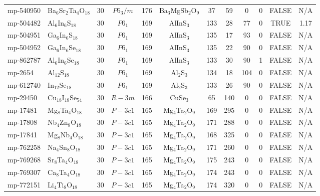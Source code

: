 {\begin{longtable}{llcccccccccc}
    mp-540950 & Ba$_{6}$Sr$_{2}$Ta$_{4}$O$_{18}$ & 30    & $P6_3/m$ & 176   & Ba$_{3}$MgSb$_{2}$O$_{9}$ & 37    & 59    & 0     & 0     & FALSE & N/A \\
    mp-504482 & Al$_{6}$In$_{6}$S$_{18}$ & 30    & $P6_1$ & 169   & AlInS$_{3}$ & 133   & 28    & 77    & 0     & TRUE  & 1.17  \\
    mp-504951 & Ga$_{6}$In$_{6}$S$_{18}$ & 30    & $P6_1$ & 169   & AlInS$_{3}$ & 135   & 17    & 93    & 0     & FALSE & N/A \\
    mp-504952 & Ga$_{6}$In$_{6}$Se$_{18}$ & 30    & $P6_1$ & 169   & AlInS$_{3}$ & 135   & 22    & 90    & 0     & FALSE & N/A \\
    mp-862787 & Al$_{6}$In$_{6}$Se$_{18}$ & 30    & $P6_1$ & 169   & AlInS$_{3}$ & 133   & 30    & 90    & 1     & FALSE & N/A \\
    mp-2654 & Al$_{12}$S$_{18}$ & 30    & $P6_1$ & 169   & Al$_{2}$S$_{3}$ & 134   & 18    & 104   & 0     & FALSE & N/A \\
    mp-612740 & In$_{12}$Se$_{18}$ & 30    & $P6_1$ & 169   & Al$_{2}$S$_{3}$ & 133   & 26    & 90    & 0     & FALSE & N/A \\
    mp-29450 & Cu$_{18}$I$_{18}$Se$_{54}$ & 30    & $R-3m$ & 166   & CuSe$_{3}$ & 65    & 140   & 0     & 0     & FALSE & N/A \\
    mp-17481 & Mg$_{8}$Ta$_{4}$O$_{18}$ & 30    & $P-3c1$ & 165   & Mg$_{4}$Ta$_{2}$O$_{9}$ & 169   & 295   & 0     & 0     & FALSE & N/A \\
    mp-17808 & Nb$_{4}$Zn$_{8}$O$_{18}$ & 30    & $P-3c1$ & 165   & Mg$_{4}$Ta$_{2}$O$_{9}$ & 171   & 288   & 0     & 0     & FALSE & N/A \\
    mp-17841 & Mg$_{8}$Nb$_{4}$O$_{18}$ & 30    & $P-3c1$ & 165   & Mg$_{4}$Ta$_{2}$O$_{9}$ & 168   & 325   & 0     & 0     & FALSE & N/A \\
    mp-762258 & Na$_{4}$Sn$_{8}$O$_{18}$ & 30    & $P-3c1$ & 165   & Mg$_{4}$Ta$_{2}$O$_{9}$ & 171   & 260   & 0     & 0     & FALSE & N/A \\
    mp-769268 & Sr$_{8}$Ta$_{4}$O$_{18}$ & 30    & $P-3c1$ & 165   & Mg$_{4}$Ta$_{2}$O$_{9}$ & 175   & 243   & 0     & 0     & FALSE & N/A \\
    mp-769307 & Ca$_{8}$Ta$_{4}$O$_{18}$ & 30    & $P-3c1$ & 165   & Mg$_{4}$Ta$_{2}$O$_{9}$ & 174   & 243   & 0     & 0     & FALSE & N/A \\
    mp-772151 & Li$_{4}$Ti$_{8}$O$_{18}$ & 30    & $P-3c1$ & 165   & Mg$_{4}$Ta$_{2}$O$_{9}$ & 174   & 320   & 0     & 0     & FALSE & N/A \\

\end{longtable}}
